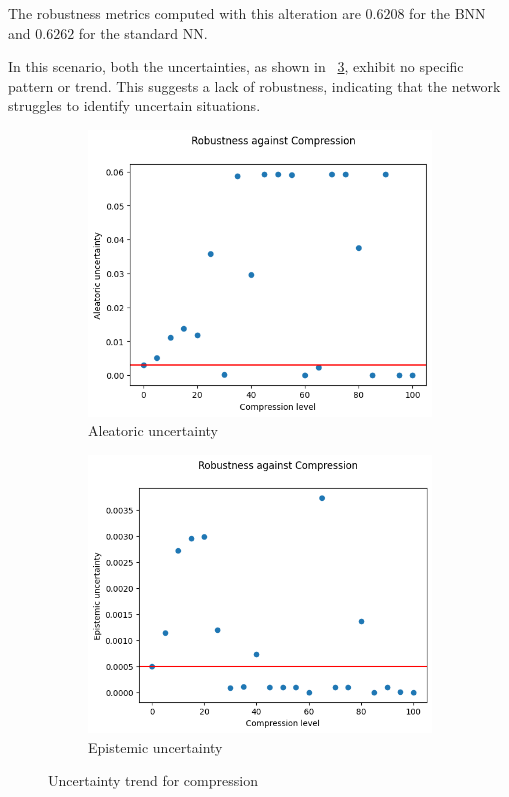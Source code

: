 The robustness metrics computed with this alteration are $0.6208$ for the BNN and $0.6262$ for the standard NN.

In this scenario, both the uncertainties, as shown in \Fig~\ref{fig:co_uncertainty}, exhibit no specific pattern or trend. This suggests a lack of robustness, indicating that the network struggles to identify uncertain situations.
\begin{figure}[H]
	\centering
	\begin{subfigure}{.5\textwidth}
		\centering
		\includegraphics[width=0.9\linewidth]{ImageFiles/EvalBNN/CO/aleatoric}
		\caption{Aleatoric uncertainty}
		\label{fig:co_aleatoric}
	\end{subfigure}%
	\begin{subfigure}{.5\textwidth}
		\centering
		\includegraphics[width=0.9\linewidth]{ImageFiles/EvalBNN/CO/epistemic}
		\caption{Epistemic uncertainty}
		\label{fig:co_epistemic}
	\end{subfigure}
	\caption{Uncertainty trend for compression}
	\label{fig:co_uncertainty}
\end{figure}

